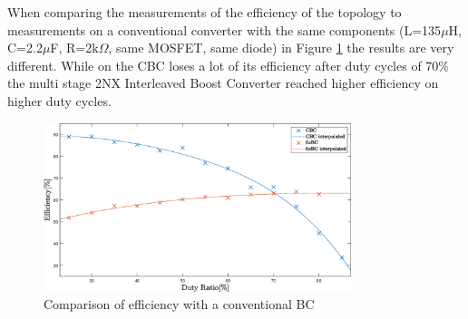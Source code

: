 When comparing the measurements of the efficiency of the topology to measurements on a conventional converter with the same components (L=135$\mu$H, C=2.2$\mu$F, R=2k$\Omega$, same MOSFET, same diode) in Figure \ref{fig:Efficiencycomparison} the results are very different.
While on the CBC loses a lot of its efficiency after duty cycles of 70\% the multi stage 2NX Interleaved Boost Converter reached higher efficiency on higher duty cycles.

\begin{figure}[H]
	\begin{center}
   \includegraphics[width=0.8\textwidth]{figures/Efficiencycomparison.eps}
	\end{center}
	\vspace{-4mm}
	\caption{Comparison of efficiency with a conventional BC}
	\label{fig:Efficiencycomparison}
\end{figure}